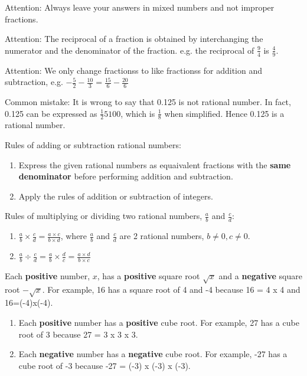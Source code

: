 \documentclass[../main]{subfiles}
\begin{document}
Attention: Always leave your answers in mixed numbers and not improper
fractions.

Attention: The reciprocal of a fraction is obtained by interchanging the
numerator and the denominator of the fraction. e.g. the reciprocal of \(\frac 9
4\) is \(\frac 4 9\).

Attention: We only change fractionss to like fractionss for addition and
subtraction, e.g. \(-{\frac 5 2} -{\frac {10} 3} = {\frac {15} 6 } - {\frac {20}
6}\)

Common mistake:
It is wrong to say that 0.125 is not rational number. In fact, 0.125 can be
expressed as \(\frac 125 100\), which is \(\frac 1 8\) when simplified. Hence
0.125 is a rational number.

Rules of adding or subtraction rational numbers:
\begin{enumerate}
\item Express the given rational numbers as equaivalent fractions with the
  \textbf{same denominator} before performing addition and subtraction.
\item Apply the rules of addition or subtraction of integers.
\end{enumerate}


Rules of multiplying or dividing two rational numbers, \(\frac a b \) and
\(\frac c d\):

\begin{enumerate}
\item \({\frac a b} \times {\frac c d} = {\frac {a \times c } {b \times d}}\),
  where \(\frac a b\) and \(\frac c d\) are 2 rational numbers, \(b \neq 0, c
  \neq 0\).
\item \({\frac a b} \div {\frac c d } = {\frac a b } \times {\frac d c} =
  {\frac {a \times d} {b \times c}}\)
\end{enumerate}

Each \textbf{positive} number, \(x\), has a \textbf{positive} square root
\(\sqrt x\) and a \textbf{negative} square root \(- \sqrt x\). For example,
16 has a square root of 4 and -4 because 16 = 4 x 4 and 16=(-4)x(-4).  


\begin{enumerate}
\item Each \textbf{positive} number has a \textbf{positive} cube root. For
  example, 27 has a cube root of 3 because 27 = 3 x 3 x 3.
\item Each \textbf{negative} number has a \textbf{negative} cube root. For
  example, -27 has a cube root of -3 because -27 = (-3) x (-3) x (-3). 
\end{enumerate}
\end{document}
